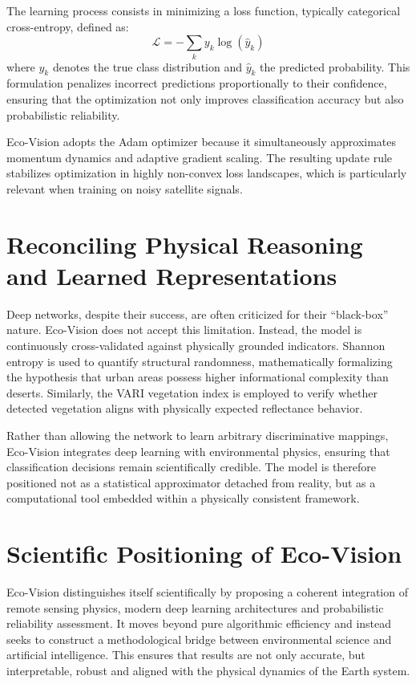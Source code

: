 \documentclass[12pt,a4paper]{report}
\begin{document}
The learning process consists in minimizing a loss function, typically categorical cross-entropy, defined as:
\[
\mathcal{L} = -\sum_{k} y_k \log(\hat{y}_k)
\]
where $y_k$ denotes the true class distribution and $\hat{y}_k$ the predicted probability. This formulation penalizes incorrect predictions proportionally to their confidence, ensuring that the optimization not only improves classification accuracy but also probabilistic reliability.

Eco-Vision adopts the Adam optimizer because it simultaneously approximates momentum dynamics and adaptive gradient scaling. The resulting update rule stabilizes optimization in highly non-convex loss landscapes, which is particularly relevant when training on noisy satellite signals.

\section{Reconciling Physical Reasoning and Learned Representations}

Deep networks, despite their success, are often criticized for their “black-box” nature. Eco-Vision does not accept this limitation. Instead, the model is continuously cross-validated against physically grounded indicators. Shannon entropy is used to quantify structural randomness, mathematically formalizing the hypothesis that urban areas possess higher informational complexity than deserts. Similarly, the VARI vegetation index is employed to verify whether detected vegetation aligns with physically expected reflectance behavior.

Rather than allowing the network to learn arbitrary discriminative mappings, Eco-Vision integrates deep learning with environmental physics, ensuring that classification decisions remain scientifically credible. The model is therefore positioned not as a statistical approximator detached from reality, but as a computational tool embedded within a physically consistent framework.

\section{Scientific Positioning of Eco-Vision}

Eco-Vision distinguishes itself scientifically by proposing a coherent integration of remote sensing physics, modern deep learning architectures and probabilistic reliability assessment. It moves beyond pure algorithmic efficiency and instead seeks to construct a methodological bridge between environmental science and artificial intelligence. This ensures that results are not only accurate, but interpretable, robust and aligned with the physical dynamics of the Earth system.
\end{document}

